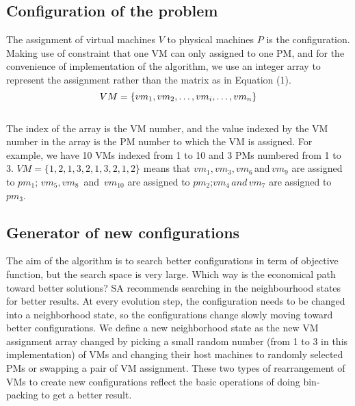 \documentclass[10pt, conference, compsocconf]{IEEEtran}
\begin{document}
\subsection{Configuration of the problem}
The assignment of virtual machines $V$ to physical machines $P$ is the
configuration. Making use of constraint that one VM can only assigned to one PM,
and for the convenience of implementation of the algorithm, we use an integer
array to represent the assignment rather than the matrix as in Equation (1). \\
\begin{equation}\label{10}
VM=\{vm_1,vm_2,\ldots,vm_i,\ldots,vm_{n}\} \\
\end{equation}\\
The index of the array is the VM number, and the value indexed by the VM number
in the array is the PM number to which the VM is assigned. For example, we have
10 VMs indexed from 1 to 10 and 3 PMs numbered from 1 to 3.
$VM=\{1,2,1,3,2,1,3,2,1,2\}$ means that $vm_1,vm_3,vm_6 \, $and$ \, vm_9$ are
assigned to $pm_1$; $vm_5,vm_8 \,$ and $\, vm_{10}$ are assigned to $pm_2$;$vm_4
\, and \, vm_7$ are assigned to $pm_3$.

\subsection{Generator of new configurations }
The aim of the algorithm is to search better configurations in term of objective
function, but the search space is very large. Which way is the economical path
toward better solutions? SA recommends searching in the neighbourhood states for
better results. At every evolution step, the configuration needs to be changed
into a neighborhood state, so the configurations change slowly moving toward
better configurations. We define a new neighborhood state as the new VM
assignment array changed by picking a small random number (from 1 to 3 in this
implementation) of VMs and changing their host machines to randomly selected PMs
or swapping a pair of VM assignment.
These two types of rearrangement of VMs to create new configurations reflect the
basic operations of doing bin-packing to get a better result.
\end{document}
